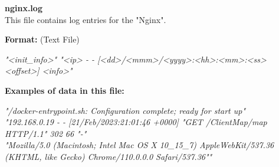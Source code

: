\begin{description}
\begin{addmargin}[0em]{0em}
    \label{nginx.log}
    \begin{addmargin}[1em]{0em} %
        \textbf{nginx.log}\\
        This file contains log entries for the "Nginx".
        \begin{addmargin}[1em]{0em}
            \textbf{Format:} (Text File)
            \begin{addmargin}[1em]{0em}
                \textit{"<init\_info>" "<ip> - - [<dd>/<mmm>/<yyyy>:<hh>:<mm>:<ss> <offset>] <info>"}
            \end{addmargin}
        \end{addmargin}
        \begin{addmargin}[1em]{0em}
            \textbf{Examples of data in this file:}
            \begin{addmargin}[1em]{0em}\textit{"/docker-entrypoint.sh: Configuration complete; ready for start up"\\
                "192.168.0.19 - - [21/Feb/2023:21:01:46 +0000] "GET /ClientMap/map HTTP/1.1" 302 66 "-"\\
                "Mozilla/5.0 (Macintosh; Intel Mac OS X 10\_15\_7) AppleWebKit/537.36 (KHTML, like Gecko) Chrome/110.0.0.0 Safari/537.36""}
            \end{addmargin}
        \end{addmargin}
    \end{addmargin} %
    \textbf{\\}


\end{addmargin}
\end{description}
